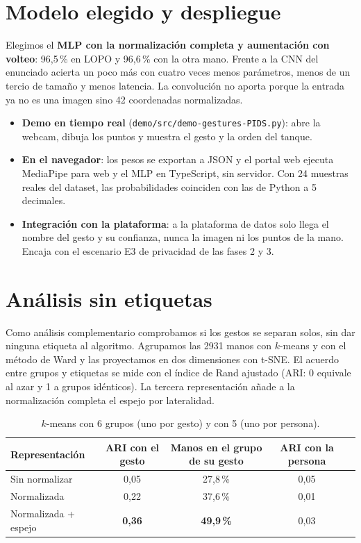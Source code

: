 \documentclass[11pt,a4paper]{article}
\newcommand{\pct}[1]{#1\,\%}
\newcommand{\codigo}[1]{\texttt{#1}}
\newcommand{\mejor}[1]{\textbf{#1}}
\begin{document}
\section{Modelo elegido y despliegue}

Elegimos el \textbf{MLP con la normalización completa y aumentación con volteo}: \pct{96,5} en LOPO y \pct{96,6} con
la otra mano. Frente a la CNN del enunciado acierta un poco más con cuatro veces menos parámetros, menos de un tercio
de tamaño y menos latencia. La convolución no aporta porque la entrada ya no es una imagen sino 42 coordenadas
normalizadas.

\begin{itemize}
  \item \textbf{Demo en tiempo real} (\codigo{demo/src/demo-gestures-PIDS.py}): abre la webcam, dibuja los puntos y
        muestra el gesto y la orden del tanque.
  \item \textbf{En el navegador}: los pesos se exportan a JSON y el portal web ejecuta MediaPipe para web y el MLP en
        TypeScript, sin servidor. Con 24 muestras reales del dataset, las probabilidades coinciden con las de Python a
        5 decimales.
  \item \textbf{Integración con la plataforma}: a la plataforma de datos solo llega el nombre del gesto y su confianza,
        nunca la imagen ni los puntos de la mano. Encaja con el escenario E3 de privacidad de las fases 2 y 3.
\end{itemize}

\section{Análisis sin etiquetas}

Como análisis complementario comprobamos si los gestos se separan solos, sin dar ninguna etiqueta al algoritmo.
Agrupamos las \num{2931} manos con $k$-means y con el método de Ward y las proyectamos en dos dimensiones con t-SNE.
El acuerdo entre grupos y etiquetas se mide con el índice de Rand ajustado (ARI: 0 equivale al azar y 1 a grupos
idénticos). La tercera representación añade a la normalización completa el espejo por lateralidad.

\begin{table}[H]
\centering\small
\begin{tabular}{lcccc}
\toprule
Representación & ARI con el gesto & Manos en el grupo de su gesto & ARI con la persona \\
\midrule
Sin normalizar & 0,05 & \pct{27,8} & 0,05 \\
Normalizada & 0,22 & \pct{37,6} & 0,01 \\
Normalizada + espejo & \mejor{0,36} & \mejor{\pct{49,9}} & 0,03 \\
\bottomrule
\end{tabular}
\caption{$k$-means con 6 grupos (uno por gesto) y con 5 (uno por persona).}
\end{table}
\end{document}
